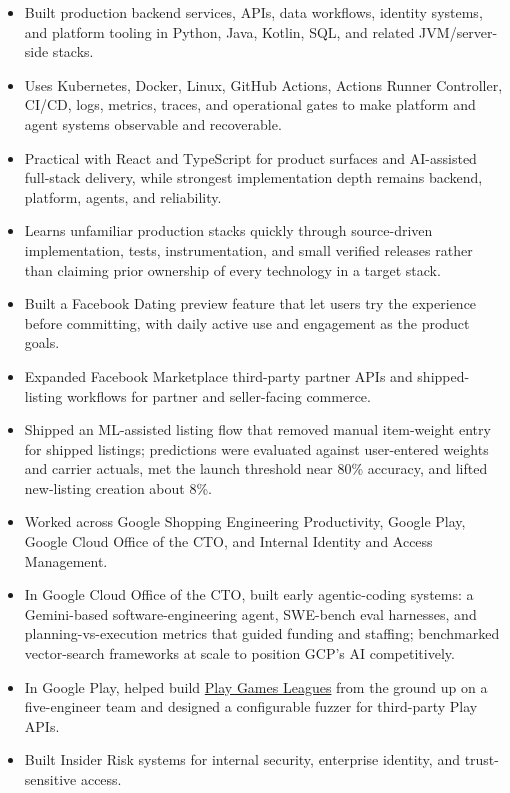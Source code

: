 \begin{itemize}
  \item Built production backend services, APIs, data workflows, identity systems, and platform tooling in Python, Java, Kotlin, SQL, and related JVM/server-side stacks.
  \item Uses Kubernetes, Docker, Linux, GitHub Actions, Actions Runner Controller, CI/CD, logs, metrics, traces, and operational gates to make platform and agent systems observable and recoverable.
  \item Practical with React and TypeScript for product surfaces and AI-assisted full-stack delivery, while strongest implementation depth remains backend, platform, agents, and reliability.
  \item Learns unfamiliar production stacks quickly through source-driven implementation, tests, instrumentation, and small verified releases rather than claiming prior ownership of every technology in a target stack.
\end{itemize}


\begin{itemize}
  \item Built a Facebook Dating preview feature that let users try the experience before committing, with daily active use and engagement as the product goals.
  \item Expanded Facebook Marketplace third-party partner APIs and shipped-listing workflows for partner and seller-facing commerce.
  \item Shipped an ML-assisted listing flow that removed manual item-weight entry for shipped listings; predictions were evaluated against user-entered weights and carrier actuals, met the launch threshold near 80\% accuracy, and lifted new-listing creation about 8\%.
\end{itemize}

\begin{itemize}
  \item Worked across Google Shopping Engineering Productivity, Google Play, Google Cloud Office of the CTO, and Internal Identity and Access Management.
  \item In Google Cloud Office of the CTO, built early agentic-coding systems: a Gemini-based software-engineering agent, SWE-bench eval harnesses, and planning-vs-execution metrics that guided funding and staffing; benchmarked vector-search frameworks at scale to position GCP's AI competitively.
  \item In Google Play, helped build \href{https://blog.google/products-and-platforms/platforms/google-play/curation-update-september-2025/}{Play Games Leagues} from the ground up on a five-engineer team and designed a configurable fuzzer for third-party Play APIs.
  \item Built Insider Risk systems for internal security, enterprise identity, and trust-sensitive access.
\end{itemize}


